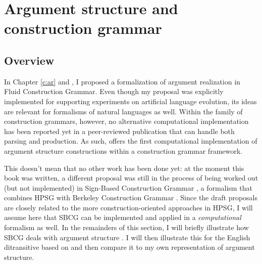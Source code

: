 \section{Argument structure and construction grammar}
\label{s:comp-formalism}

\subsection{Overview}
In Chapter \ref{c:ar} and \citet{vantrijp08argumentsstruktur}, I proposed a formalization of argument realization in Fluid Construction Grammar. Even though my proposal was explicitly implemented for supporting experiments on artificial language evolution, its ideas are relevant for formalisms of natural languages as well. Within the family of construction grammars, however, no alternative computational implementation has been reported yet in a peer-reviewed publication that can handle both parsing and production. As such, \citet{vantrijp08argumentsstruktur} offers the first computational implementation of argument structure constructions within a construction grammar framework.

This doesn't mean that no other work has been done yet: at the moment this book was written, a different proposal was still in the process of being worked out (but not implemented) in Sign-Based Construction Grammar \citep[SBCG,][]{fillmore08construction}, a formalism that combines HPSG \citep{sag94hpsg} with Berkeley Construction Grammar \citep[BCG,][]{kay99grammatical}. Since the draft proposals are closely related to the more construction-oriented approaches in HPSG, I will assume here that SBCG can be implemented and applied in a {\em computational} formalism as well. In the remainders of this section, I will briefly illustrate how SBCG deals with argument structure \citep[based on][]{fillmore08construction, kay05argument, michaelis06complementation,sag07sbcg}. I will then illustrate this for the English ditransitive based on \citet{kay05argument} and then compare it to my own representation of argument structure.

